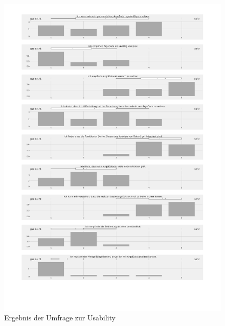 \begin{figure}
 \centering
 \includegraphics[width=\textwidth,height=0.98\textheight,clip=true,trim=2cm 3cm 1.6cm 1cm]{pix/surveyAuswertung.pdf}
 
 \label{fig:surveyAuswertung}
 \caption{Ergebnis der Umfrage zur Usability}
\end{figure}






